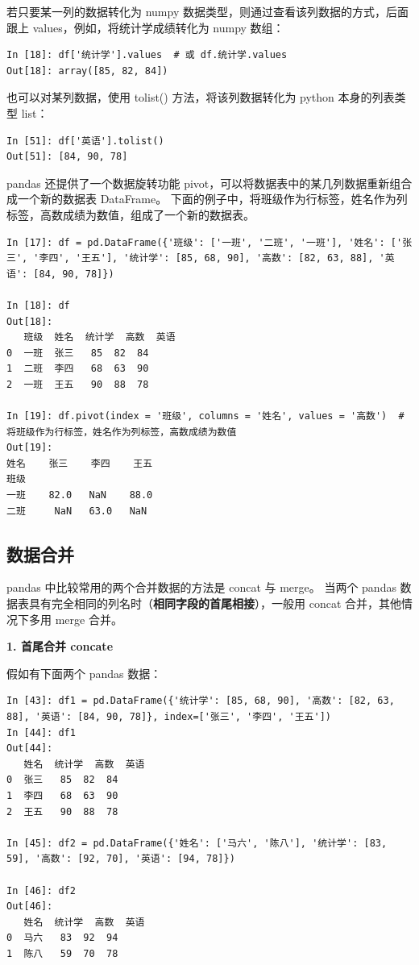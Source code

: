 若只要某一列的数据转化为 numpy 数据类型，则通过查看该列数据的方式，后面跟上 values，例如，将统计学成绩转化为 numpy 数组：

\begin{lstlisting}[Language=Python]
In [18]: df['统计学'].values  # 或 df.统计学.values
Out[18]: array([85, 82, 84])
\end{lstlisting}

也可以对某列数据，使用 tolist() 方法，将该列数据转化为 python 本身的列表类型 list：

\begin{lstlisting}[Language=Python]
In [51]: df['英语'].tolist()
Out[51]: [84, 90, 78]
\end{lstlisting}


pandas 还提供了一个数据旋转功能 pivot，可以将数据表中的某几列数据重新组合成一个新的数据表 DataFrame。 下面的例子中，将班级作为行标签，姓名作为列标签，高数成绩为数值，组成了一个新的数据表。

\begin{lstlisting}[Language=Python]
In [17]: df = pd.DataFrame({'班级': ['一班', '二班', '一班'], '姓名': ['张三', '李四', '王五'], '统计学': [85, 68, 90], '高数': [82, 63, 88], '英语': [84, 90, 78]})

In [18]: df
Out[18]:
   班级  姓名  统计学  高数  英语
0  一班  张三   85  82  84
1  二班  李四   68  63  90
2  一班  王五   90  88  78

In [19]: df.pivot(index = '班级', columns = '姓名', values = '高数')  # 将班级作为行标签，姓名作为列标签，高数成绩为数值
Out[19]:
姓名    张三    李四    王五
班级
一班    82.0   NaN    88.0
二班     NaN   63.0   NaN
\end{lstlisting}

\subsection{数据合并}

pandas 中比较常用的两个合并数据的方法是 concat 与 merge。 当两个 pandas 数据表具有完全相同的列名时（\textbf{相同字段的首尾相接}），一般用 concat 合并，其他情况下多用 merge 合并。

\vspace{3pt}
\noindent\textbf{1. 首尾合并 concate }
\vspace{3pt}

假如有下面两个 pandas 数据：

\begin{lstlisting}[Language=Python]
In [43]: df1 = pd.DataFrame({'统计学': [85, 68, 90], '高数': [82, 63, 88], '英语': [84, 90, 78]}, index=['张三', '李四', '王五'])
In [44]: df1
Out[44]:
   姓名  统计学  高数  英语
0  张三   85  82  84
1  李四   68  63  90
2  王五   90  88  78

In [45]: df2 = pd.DataFrame({'姓名': ['马六', '陈八'], '统计学': [83, 59], '高数': [92, 70], '英语': [94, 78]})

In [46]: df2
Out[46]:
   姓名  统计学  高数  英语
0  马六   83  92  94
1  陈八   59  70  78
\end{lstlisting}

